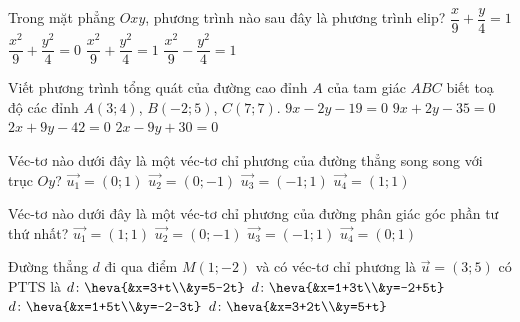 \begin{ex}%
	Trong mặt phẳng $Oxy$, phương trình nào sau đây là phương trình elip?
	\choice
	{$\dfrac{x}{9}+\dfrac{y}{4}=1$}
	{$\dfrac{x^2}{9}+\dfrac{y^2}{4}=0$}
	{\True $\dfrac{x^2}{9}+\dfrac{y^2}{4}=1$}
	{$\dfrac{x^2}{9}-\dfrac{y^2}{4}=1$}
\end{ex}	
	\begin{ex}%
		Viết phương trình tổng quát của đường cao đỉnh $A$ của tam giác $ABC$ biết toạ độ các đỉnh $A\left( 3;4 \right)$, $B\left( -2;5 \right)$, $C\left( 7;7 \right)$.
		\choice
		{$9x-2y-19=0$}
		{\True $9x+2y-35=0$}
		{$2x+9y-42=0$}
		{$2x-9y+30=0$}
	\end{ex}

	\begin{ex}%
	Véc-tơ nào dưới đây là một véc-tơ chỉ phương của đường thẳng song song với trục $Oy$?
		\choice
	{\True $\overrightarrow{u_{1}}=(0;1)$}
	{$\overrightarrow{u_{2}}=(0;-1)$}
	{$\overrightarrow{u_{3}}=(-1;1)$}
	{$\overrightarrow{u_{4}}=(1;1)$}
\end{ex}
	\begin{ex}%
	Véc-tơ nào dưới đây là một véc-tơ chỉ phương của đường phân giác góc phần tư thứ nhất?
		\choice
	{\True $\overrightarrow{u_{1}}=(1;1)$}
	{$\overrightarrow{u_{2}}=(0;-1)$}
	{$\overrightarrow{u_{3}}=(-1;1)$}
	{$\overrightarrow{u_{4}}=(0;1)$}
\end{ex}

	\begin{ex}%
	Đường thẳng $d$ đi qua điểm $M(1;-2)$ và có  véc-tơ chỉ phương là $\overrightarrow{u}=(3;5)$ có PTTS là
		\choice
	{$d \colon \heva{&x=3+t\\&y=5-2t}$}
	{\True $d \colon \heva{&x=1+3t\\&y=-2+5t}$}
	{$d \colon \heva{&x=1+5t\\&y=-2-3t}$}
	{$d \colon \heva{&x=3+2t\\&y=5+t}$}
\end{ex}

